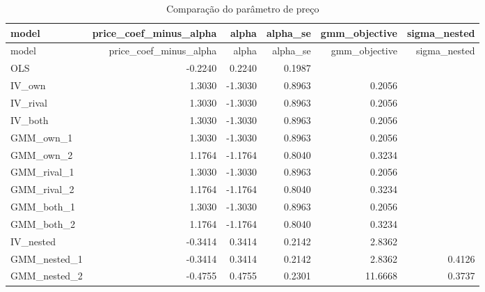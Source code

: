 \begingroup
\scriptsize
\begin{longtable}{@{}lrrrrr@{}}
\caption{Comparação do parâmetro de preço}\label{tab:price-compare}\\
\toprule
model & price\_coef\_minus\_alpha & alpha & alpha\_se & gmm\_objective & sigma\_nested \\
\midrule
\endfirsthead
\toprule
model & price\_coef\_minus\_alpha & alpha & alpha\_se & gmm\_objective & sigma\_nested \\
\midrule
\endhead
OLS & -0.2240 & 0.2240 & 0.1987 &  &  \\
IV\_own & 1.3030 & -1.3030 & 0.8963 & 0.2056 &  \\
IV\_rival & 1.3030 & -1.3030 & 0.8963 & 0.2056 &  \\
IV\_both & 1.3030 & -1.3030 & 0.8963 & 0.2056 &  \\
GMM\_own\_1 & 1.3030 & -1.3030 & 0.8963 & 0.2056 &  \\
GMM\_own\_2 & 1.1764 & -1.1764 & 0.8040 & 0.3234 &  \\
GMM\_rival\_1 & 1.3030 & -1.3030 & 0.8963 & 0.2056 &  \\
GMM\_rival\_2 & 1.1764 & -1.1764 & 0.8040 & 0.3234 &  \\
GMM\_both\_1 & 1.3030 & -1.3030 & 0.8963 & 0.2056 &  \\
GMM\_both\_2 & 1.1764 & -1.1764 & 0.8040 & 0.3234 &  \\
IV\_nested & -0.3414 & 0.3414 & 0.2142 & 2.8362 &  \\
GMM\_nested\_1 & -0.3414 & 0.3414 & 0.2142 & 2.8362 & 0.4126 \\
GMM\_nested\_2 & -0.4755 & 0.4755 & 0.2301 & 11.6668 & 0.3737 \\
\bottomrule
\end{longtable}
\endgroup
